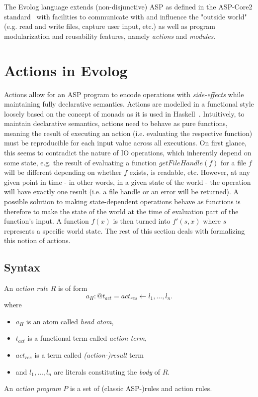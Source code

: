 The Evolog language extends (non-disjunctive) ASP as defined in the ASP-Core2 standard~\cite{asp-core2} with facilities to communicate with and influence the "outside world" (e.g. read and write files, capture user input, etc.) as well as program modularization and reusability features, namely \emph{actions} and \emph{modules}.

\section{Actions in Evolog}
\label{sec:evolog-actions}

Actions allow for an ASP program to encode operations with \emph{side-effects} while maintaining fully declarative semantics. Actions are modelled in a functional style loosely based on the concept of monads as it is used in Haskell~\cite{monads}. Intuitively, to maintain declarative semantics, actions need to behave as pure functions, meaning the result of executing an action (i.e. evaluating the respective function) must be reproducible for each input value across all executions. On first glance, this seems to contradict the nature of IO operations, which inherently depend on some state, e.g. the result of evaluating a function $getFileHandle(f)$ for a file $f$ will be different depending on whether $f$ exists, is readable, etc. However, at any given point in time - in other words, in a given state of the world - the operation will have exactly one result (i.e. a file handle or an error will be returned). A possible solution to making state-dependent operations behave as functions is therefore to make the state of the world at the time of evaluation part of the function's input. A function $f(x)$ is then turned into $f'(s, x)$  where $s$ represents a specific world state. The rest of this section deals with formalizing this notion of actions.

\subsection{Syntax}
\label{subsec:evolog-actions-syntax}

\begin{definition}
\label{def:action-rule-syntax}
An \emph{action rule} $R$ is of form
\[
	a_H : @t_{act} = act_{res} \leftarrow l_1,\ldots,l_n.
\]
where
\begin{itemize}
	\item $a_H$ is an atom called \emph{head atom},
	\item $t_{act}$ is a functional term called \emph{action term},
	\item $act_{res}$ is a term called \emph{(action-)result} term
	\item and $l_1,\ldots,l_n$ are literals constituting the \emph{body} of $R$.
\end{itemize}
An \emph{action program} $P$ is a set of (classic ASP-)rules and action rules.
\end{definition}

